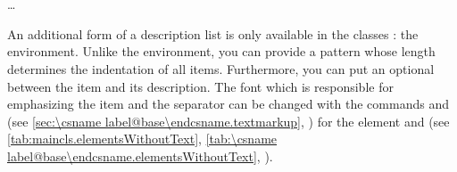 \fi%
%
%
%
\fi %

\begin{Declaration}
  \\
  \quad{}\\
  \quad\dots\\
\end{Declaration}%
%
%
An additional form of a description list is only available in the
{\KOMAScript} classes%
: the
 environment. Unlike the
 environment, you can provide a pattern whose length
determines the indentation of all items. Furthermore, you can put an optional
 between the item and its description.  The
font%
which is responsible for emphasizing the item and the separator can be changed
with the commands  and  (see \autoref{sec:\csname
  label@base\endcsname.textmarkup}, ) for the element
 and
 (see
\ifCommonscrextend
\autoref{tab:maincls.elementsWithoutText},
\else
\autoref{tab:\csname label@base\endcsname.elementsWithoutText},
%
\fi).
\ifCommonscrlttr\par\else
